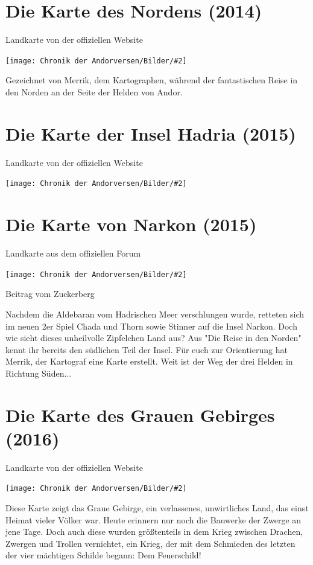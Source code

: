 \documentclass[10pt, a4paper, oneside]{book}
\newcommand{\produkt}[1]{%
    \section{#1}%
    \label{Produkt: #1}%
}
\newcommand{\bildmitts}[2][height=0.32\textwidth,width=0.48\textwidth,keepaspectratio]{%
    \begin{center}
        \texttt{[image: Chronik der Andorversen/Bilder/\#2]}
    \end{center}
}
\begin{document}
\newpage
\produkt{Die Karte des Nordens (2014)}

\begin{center}
    Landkarte von der offiziellen Website
\end{center}

\bildmitts[width=\textwidth]{Die Karte des Nordens.jpg}

Gezeichnet von Merrik, dem Kartographen, während der fantastischen Reise in den Norden an der Seite der Helden von Andor.


\newpage
\produkt{Die Karte der Insel Hadria (2015)}

\begin{center}
    Landkarte von der offiziellen Website
\end{center}

\bildmitts[width=\textwidth]{Die Karte der Insel Hadria.jpg}



\newpage
\produkt{Die Karte von Narkon (2015)}

\begin{center}
    Landkarte aus dem offiziellen Forum
\end{center}

\bildmitts[width=0.9\textwidth]{Die Karte von Narkon.jpeg}

\begin{center}
    Beitrag vom Zuckerberg
\end{center}

Nachdem die Aldebaran vom Hadrischen Meer verschlungen wurde, retteten sich im neuen 2er Spiel Chada und Thorn sowie Stinner auf die Insel Narkon. Doch wie sieht dieses unheilvolle Zipfelchen Land aus? Aus "Die Reise in den Norden" kennt ihr bereits den südlichen Teil der Insel. Für euch zur Orientierung hat Merrik, der Kartograf eine Karte erstellt. Weit ist der Weg der drei Helden in Richtung Süden...


\newpage
\produkt{Die Karte des Grauen Gebirges (2016)}

\begin{center}
    Landkarte von der offiziellen Website
\end{center}

\bildmitts[width=\textwidth]{Die Karte des Grauen Gebirges.jpg}

Diese Karte zeigt das Graue Gebirge, ein verlassenes, unwirtliches Land, das einst Heimat vieler Völker war. Heute erinnern nur noch die Bauwerke der Zwerge an jene Tage. Doch auch diese wurden größtenteils in dem Krieg zwischen Drachen, Zwergen und Trollen vernichtet, ein Krieg, der mit dem Schmieden des letzten der vier mächtigen Schilde begann: Dem Feuerschild!
\end{document}
